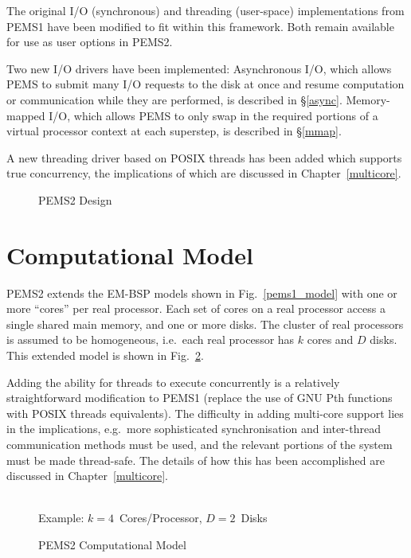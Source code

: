 \documentclass[12pt]{carletoncsthesis}
\begin{document}
The original I/O (synchronous) and threading (user-space) implementations
from PEMS1 have been modified to fit within this framework.  Both remain
available for use as user options in PEMS2.

Two new I/O drivers have been implemented: Asynchronous I/O, which allows
PEMS to submit many I/O requests to the disk at once and resume computation
or communication while they are performed, is described in \S\ref{async}.
Memory-mapped I/O, which allows PEMS to only swap in the required portions
of a virtual processor context at each superstep, is described in \S\ref{mmap}.

A new threading driver based on POSIX threads has been added which
supports true concurrency, the implications of which are discussed in
Chapter~\ref{multicore}.

\begin{figure}[ht]
\begin{center}
\caption{PEMS2 Design}
\label{pems2_design}
\end{center}
\end{figure}


\clearpage
\section{Computational Model}


PEMS2 extends the EM-BSP \cite{dhthesis}\cite{bspem}\cite{emsimulation}
models shown in Fig.~\ref{pems1_model} with one or more ``cores'' per real
processor.  Each set of cores on a real processor access a single shared main
memory, and one or more disks.  The cluster of real processors is assumed
to be homogeneous, i.e.\ each real processor has $k$ cores and $D$ disks.
This extended model is shown in Fig.~\ref{pems2_model}.

Adding the ability for threads to execute concurrently is a relatively
straightforward modification to PEMS1 (replace the use of GNU Pth functions
with POSIX threads equivalents).  The difficulty in adding multi-core
support lies in the implications, e.g.\ more sophisticated synchronisation and
inter-thread communication methods must be used, and the relevant portions
of the system must be made thread-safe.  The details of how this has been
accomplished are discussed in Chapter~\ref{multicore}.

\begin{figure}[ht]
\begin{center}
	 \\
Example: $k=4$~Cores/Processor,
$D=2$~Disks
\end{center}
\caption{PEMS2 Computational Model}
\label{pems2_model}
\end{figure}
\end{document}
